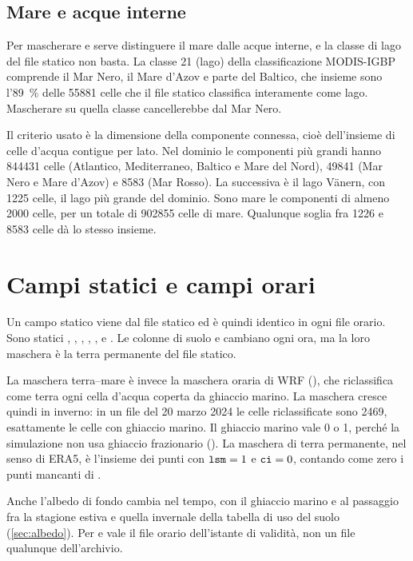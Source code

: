 \subsection{Mare e acque interne}
\label{sec:mare}

Per mascherare  e  serve distinguere il mare dalle acque interne, e la classe
di lago del file statico non basta. La classe 21 (lago) della classificazione MODIS-IGBP comprende
il Mar Nero, il Mare d'Azov e parte del Baltico, che insieme sono l'\SI{89}{\percent} delle
\num{55881} celle che il file statico classifica interamente come lago. Mascherare su quella classe
cancellerebbe  dal Mar Nero.

Il criterio usato è la dimensione della componente connessa, cioè dell'insieme di celle d'acqua
contigue per lato. Nel dominio le componenti più grandi hanno \num{844431} celle (Atlantico,
Mediterraneo, Baltico e Mare del Nord), \num{49841} (Mar Nero e Mare d'Azov) e \num{8583} (Mar
Rosso). La successiva è il lago Vänern, con \num{1225} celle, il lago più grande del dominio. Sono
mare le componenti di almeno \num{2000} celle, per un totale di \num{902855} celle di mare.
Qualunque soglia fra \num{1226} e \num{8583} celle dà lo stesso insieme.

\section{Campi statici e campi orari}
\label{sec:statici-orari}

Un campo statico viene dal file statico ed è quindi identico in ogni file orario. Sono statici
, , , , ,  e . Le
colonne di suolo  e  cambiano ogni ora, ma la loro maschera è la terra
permanente del file statico.

La maschera terra--mare  è invece la maschera oraria di WRF (), che
riclassifica come terra ogni cella d'acqua coperta da ghiaccio marino. La maschera cresce quindi in
inverno: in un file del 20 marzo 2024 le celle riclassificate sono \num{2469}, esattamente le celle
con ghiaccio marino. Il ghiaccio marino  vale 0 o 1, perché la simulazione non usa
ghiaccio frazionario (). La maschera di terra permanente, nel senso di
ERA5, è l'insieme dei punti con $\campo{lsm} = 1$ e $\campo{ci} = 0$, contando come zero i punti
mancanti di .

Anche l'albedo di fondo  cambia nel tempo, con il ghiaccio marino e al passaggio fra la
stagione estiva e quella invernale della tabella di uso del suolo (\cref{sec:albedo}). Per
 e  vale il file orario dell'istante di validità, non un file qualunque
dell'archivio.

